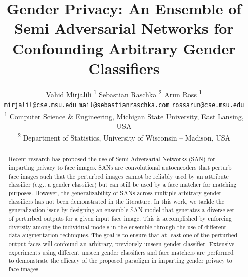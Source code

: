 \documentclass[10pt,twocolumn,letterpaper]{article}
\begin{document}
\title{Gender Privacy: An Ensemble of Semi Adversarial Networks for Confounding Arbitrary Gender Classifiers }

\author{Vahid Mirjalili\textsuperscript{ 1}  \qquad \qquad Sebastian Raschka\textsuperscript{ 2} \qquad \qquad \qquad Arun Ross\textsuperscript{ 1} \\ \;\;\;\;\;\; {\tt\small mirjalil@cse.msu.edu} \;\;\;\; \; {\tt\small mail@sebastianraschka.com}  \;\;\;  \;\;\;   {\tt\small rossarun@cse.msu.edu}  \\ 
\textsuperscript{1}  Computer Science \& Engineering, Michigan State University, East Lansing, USA \\
\textsuperscript{2} Department of Statistics, University of Wisconsin -- Madison, USA}





\maketitle
{}


\begin{abstract}


Recent research has proposed the use of Semi Adversarial Networks (SAN) for imparting privacy to face images. SANs are convolutional autoencoders that perturb face images such that the perturbed images cannot be reliably used by an attribute classifier (e.g., a gender classifier) but can still be used by a face matcher for matching purposes. However, the generalizability of SANs across multiple arbitrary gender classifiers has not been demonstrated in the literature. 
In this work, we tackle the generalization issue by designing an ensemble SAN model that generates a diverse set of perturbed outputs for a given input face image. 
This is accomplished by enforcing diversity among the individual models in the ensemble through the use of different data augmentation techniques. 
The goal is to ensure that at least one of the perturbed output faces will confound an arbitrary, previously unseen gender classifier. 
Extensive experiments using different unseen gender classifiers and face matchers are performed to demonstrate the efficacy of the proposed paradigm in imparting gender privacy to face images.
\end{abstract}
\end{document}
